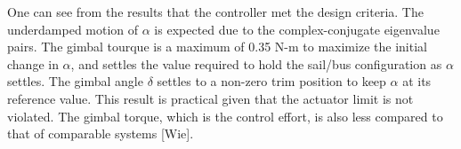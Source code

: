 \documentclass[]{aiaa-tc}%
\begin{document}
	One can see from the results that the controller met the design criteria. The underdamped motion of $\alpha$ is expected due to the complex-conjugate eigenvalue pairs. The gimbal tourque is a maximum of 0.35 N-m to maximize the initial change in $\alpha$, and settles the value required to hold the sail/bus configuration as $\alpha$ settles. The gimbal angle $\delta$ settles to a non-zero trim position to keep $\alpha$ at its reference value. This result is practical given that the actuator limit is not violated. The gimbal torque, which is the control effort, is also less compared to that of comparable systems [Wie].

%    
    
%    
%    
%    
%
%
%
%
	
\end{document}
